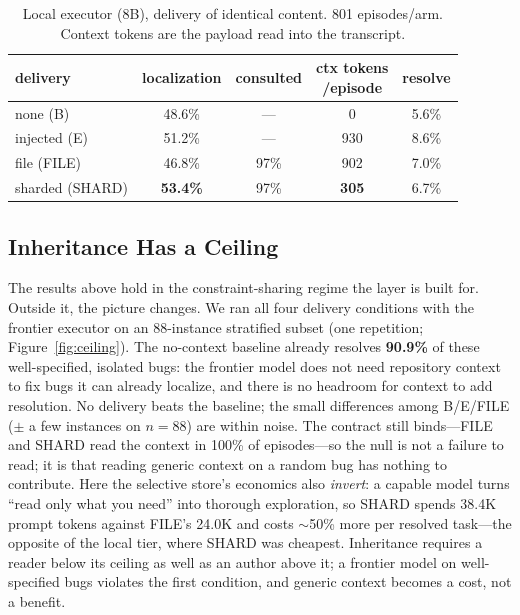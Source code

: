 \documentclass[sigconf,screen]{acmart}
\begin{document}
\begin{table}[t]
\caption{Local executor (8B), delivery of identical content. 801 episodes/arm.
Context tokens are the payload read into the transcript.}
\label{tab:delivery}
\small
\begin{tabular}{@{}lcccc@{}}
\toprule
delivery & localization & consulted & \shortstack{ctx tokens\\/episode} & resolve\\
\midrule
none (B) & 48.6\% & --- & 0 & 5.6\%\\
injected (E) & 51.2\% & --- & 930 & 8.6\%\\
file (FILE) & 46.8\% & 97\% & 902 & 7.0\%\\
sharded (SHARD) & \textbf{53.4\%} & 97\% & \textbf{305} & 6.7\%\\
\bottomrule
\end{tabular}
\end{table}

\subsection{Inheritance Has a Ceiling}\label{sec:ceiling}
The results above hold in the constraint-sharing regime the layer is built for.
Outside it, the picture changes. We ran all four delivery conditions with the frontier executor on an
88-instance stratified subset (one repetition; Figure~\ref{fig:ceiling}). The
no-context baseline already resolves \textbf{90.9\%} of these well-specified,
isolated bugs: the frontier model does not need repository context to fix bugs it
can already localize, and there is no headroom for context to add resolution. No
delivery beats the baseline; the small differences among B/E/FILE ($\pm$ a few
instances on $n=88$) are within noise. The contract still binds---FILE and SHARD
read the context in 100\% of episodes---so the null is not a failure to read; it
is that reading generic context on a random bug has nothing to contribute. Here
the selective store's economics also \emph{invert}: a capable model turns ``read
only what you need'' into thorough exploration, so SHARD spends 38.4K prompt tokens
against FILE's 24.0K and costs $\sim$50\% more per resolved task---the opposite of
the local tier, where SHARD was cheapest. Inheritance requires a reader below its
ceiling as well as an author above it; a frontier model on well-specified bugs
violates the first condition, and generic context becomes a cost, not a benefit.
\end{document}
